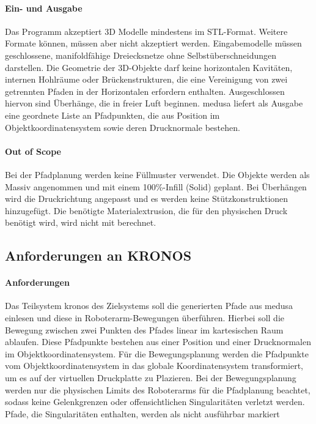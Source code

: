             \paragraph{Ein- und Ausgabe}
            Das Programm akzeptiert 3D Modelle mindestens im \ac{STL}-Format.
            Weitere Formate können, müssen aber nicht akzeptiert werden.
            Eingabemodelle müssen geschlossene, manifoldfähige Dreiecksnetze ohne Selbstüberschneidungen darstellen.
            Die Geometrie der 3D-Objekte darf keine horizontalen Kavitäten, internen Hohlräume oder Brückenstrukturen, 
            die eine Vereinigung von zwei getrennten Pfaden in der Horizontalen erfordern enthalten.
            Ausgeschlossen hiervon sind Überhänge, die in freier Luft beginnen.
            \ac{medusa} liefert als Ausgabe eine geordnete Liste an Pfadpunkten, die aus Position im Objektkoordinatensystem sowie deren Drucknormale bestehen.

            \paragraph{Out of Scope}
            Bei der Pfadplanung werden keine Füllmuster verwendet.
            Die Objekte werden als Massiv angenommen und mit einem 100\%-Infill (Solid) geplant.
            Bei Überhängen wird die Druckrichtung angepasst und es werden keine Stützkonstruktionen hinzugefügt.
            Die benötigte Materialextrusion, die für den physischen Druck benötigt wird, wird nicht mit berechnet.
        
        \subsection{Anforderungen an KRONOS}\label{subsec:kronos-requirements}

            \paragraph{Anforderungen}
            Das Teilsystem \ac{kronos} des Zielsystems soll die generierten Pfade aus \ac{medusa} einlesen und diese in Roboterarm-Bewegungen überführen.
            Hierbei soll die Bewegung zwischen zwei Punkten des Pfades linear im kartesischen Raum ablaufen.
            Diese Pfadpunkte bestehen aus einer Position und einer Drucknormalen im Objektkoordinatensystem.
            Für die Bewegungsplanung werden die Pfadpunkte vom Objektkoordinatensystem in das globale Koordinatensystem transformiert,
            um es auf der virtuellen Druckplatte zu Plazieren.
            Bei der Bewegungsplanung werden nur die physischen Limits des Roboterarms für die Pfadplanung beachtet,
            sodass keine Gelenkgrenzen oder offensichtlichen Singularitäten verletzt werden.
            Pfade, die Singularitäten enthalten, werden als nicht ausführbar markiert

